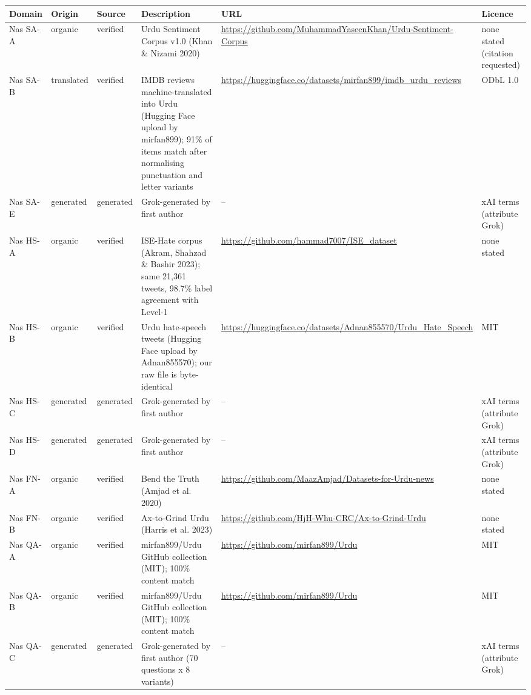 \begin{tabular}{llp{1.3cm}p{5.0cm}p{5.6cm}p{2.4cm}}
\toprule
Domain & Origin & Source & Description & URL & Licence \\
\midrule
Nas SA-A & organic & verified & Urdu Sentiment Corpus v1.0 (Khan \& Nizami 2020) \citep{khan2020usc} & \url{https://github.com/MuhammadYaseenKhan/Urdu-Sentiment-Corpus} & none stated (citation requested) \\
Nas SA-B & translated & verified & IMDB reviews machine-translated into Urdu (Hugging Face upload by mirfan899); 91\% of items match after normalising punctuation and letter variants \citep{mirfan899imdb} & \url{https://huggingface.co/datasets/mirfan899/imdb_urdu_reviews} & ODbL 1.0 \\
Nas SA-E & generated & generated & Grok-generated by first author & -- & xAI terms (attribute Grok) \\
Nas HS-A & organic & verified & ISE-Hate corpus (Akram, Shahzad \& Bashir 2023); same 21,361 tweets, 98.7\% label agreement with Level-1 \citep{akram2023isehate} & \url{https://github.com/hammad7007/ISE_dataset} & none stated \\
Nas HS-B & organic & verified & Urdu hate-speech tweets (Hugging Face upload by Adnan855570); our raw file is byte-identical \citep{adnan2025urduhate} & \url{https://huggingface.co/datasets/Adnan855570/Urdu_Hate_Speech} & MIT \\
Nas HS-C & generated & generated & Grok-generated by first author & -- & xAI terms (attribute Grok) \\
Nas HS-D & generated & generated & Grok-generated by first author & -- & xAI terms (attribute Grok) \\
Nas FN-A & organic & verified & Bend the Truth (Amjad et al. 2020) \citep{amjad2020bend} & \url{https://github.com/MaazAmjad/Datasets-for-Urdu-news} & none stated \\
Nas FN-B & organic & verified & Ax-to-Grind Urdu (Harris et al. 2023) \citep{harris2023axtogrind} & \url{https://github.com/HjH-Whu-CRC/Ax-to-Grind-Urdu} & none stated \\
Nas QA-A & organic & verified & mirfan899/Urdu GitHub collection (MIT); 100\% content match \citep{mirfan899urdu} & \url{https://github.com/mirfan899/Urdu} & MIT \\
Nas QA-B & organic & verified & mirfan899/Urdu GitHub collection (MIT); 100\% content match \citep{mirfan899urdu} & \url{https://github.com/mirfan899/Urdu} & MIT \\
Nas QA-C & generated & generated & Grok-generated by first author (70 questions x 8 variants) & -- & xAI terms (attribute Grok) \\

\end{tabular}
